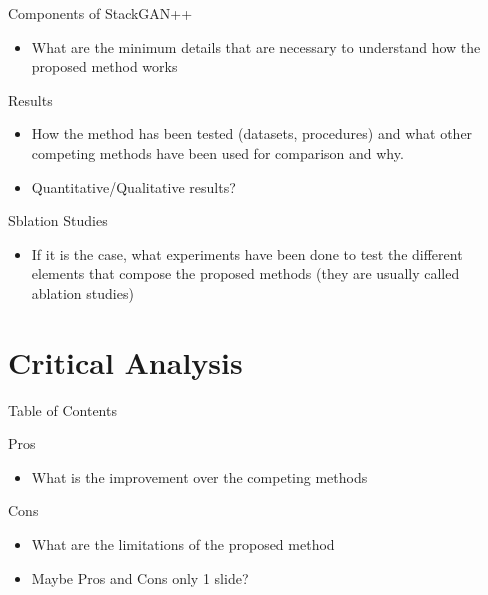 \documentclass[pdf]{beamer}
\begin{document}
\begin{frame}{Components of StackGAN++}
    \begin{figure}
        \centering
    \end{figure}
    \begin{itemize}
        \item What are the minimum details that are necessary to understand how the proposed method works
    \end{itemize}
\end{frame}

\begin{frame}{Results}
    \begin{itemize}
        \item How the method has been tested (datasets, procedures) and what other competing methods have been used for comparison and why.
        \item Quantitative/Qualitative results?
    \end{itemize}
\end{frame}

\begin{frame}{Sblation Studies}
    \begin{itemize}
        \item If it is the case, what experiments have been done to test the different elements that compose the proposed methods (they are usually called ablation studies)
    \end{itemize}
\end{frame}

\section{Critical Analysis}
\begin{frame}{Table of Contents}
    \tableofcontents[currentsection]
\end{frame}

\begin{frame}{Pros}
    \begin{itemize}
        \item What is the improvement over the competing methods
    \end{itemize}
\end{frame}

\begin{frame}{Cons}
    \begin{itemize}
        \item What are the limitations of the proposed method
        \item Maybe Pros and Cons only 1 slide?
    \end{itemize}
\end{frame}
\end{document}
